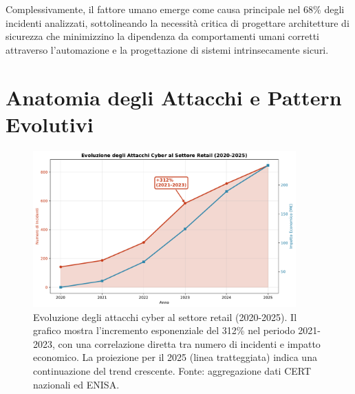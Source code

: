 Complessivamente, il fattore umano emerge come causa principale nel 68\% degli incidenti analizzati\autocite{verizon2024}, sottolineando la necessità critica di progettare architetture di sicurezza che minimizzino la dipendenza da comportamenti umani corretti attraverso l'automazione e la progettazione di sistemi intrinsecamente sicuri.

\section{\texorpdfstring{Anatomia degli Attacchi e Pattern Evolutivi}{2.3 - Anatomia degli Attacchi e Pattern Evolutivi}}

\begin{figure}[H]
\centering
\includegraphics[width=0.9\textwidth]{thesis_figures/cap2/fig_2_1_cyber_evolution.pdf}
\caption{Evoluzione degli attacchi cyber al settore retail (2020-2025). Il grafico mostra l'incremento esponenziale del 312\% nel periodo 2021-2023, con una correlazione diretta tra numero di incidenti e impatto economico. La proiezione per il 2025 (linea tratteggiata) indica una continuazione del trend crescente. Fonte: aggregazione dati CERT nazionali ed ENISA.}
\label{fig:cyber_evolution}
\end{figure}




